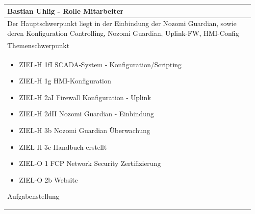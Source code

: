 \documentclass[
	headings=optiontotocandhead,%
	oneside,
	numbers=noenddot,%
	toc=flat, %
	10pt, %
	parskip=full, %
	listof=totoc, %
	listof=flat, %
	numbers=noenddot, %
	bibliography=totoc, %
	a4paper,DIV=14,
]{scrartcl}
\begin{document}
\begin{table}[H]
	\begin{tabularx} {\textwidth} {
			|>{\hsize=1\hsize}X|
		}
		
		\hline
		\rowcolor[HTML]{D9D9D9} 
		\rule{0pt}{15pt}
		\textbf{\normalsize{Bastian Uhlig - Rolle Mitarbeiter}} \\ \hline
		
		\rule{0pt}{20pt} Der Hauptschwerpunkt liegt in der Einbindung der Nozomi Guardian, sowie deren Konfiguration
		 Controlling, Nozomi Guardian, Uplink-FW, HMI-Config \\
		\rule{0pt}{11pt}\textcolor[HTML]{A6A6A6}{\footnotesize{Themenschwerpunkt}} \\ \hline
		
		\begin{itemize}[itemsep=0pt, parsep=0pt, topsep=0pt]
			\item{ZIEL-H 1fI SCADA-System - Konfiguration/Scripting}
			\item{ZIEL-H 1g HMI-Konfiguration}
			\item{ZIEL-H 2aI Firewall Konfiguration - Uplink}
			\item{ZIEL-H 2dII Nozomi Guardian - Einbindung}
			\item{ZIEL-H 3b Nozomi Guardian Überwachung}
			\item{ZIEL-H 3c Handbuch erstellt}
			\item{ZIEL-O 1 FCP Network Security Zertifizierung}
			\item{ZIEL-O 2b Website}
		\end{itemize}
		
		\rule{0pt}{11pt}\textcolor[HTML]{A6A6A6}{\footnotesize{Aufgabenstellung}} \\ \hline
	\end{tabularx}
\end{table}
\end{document}
